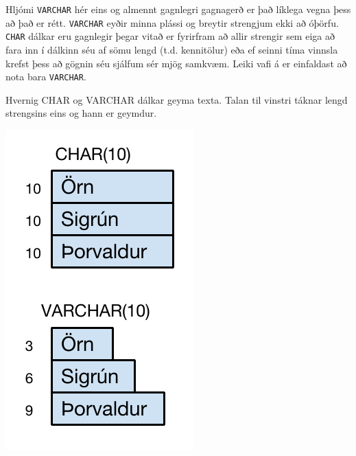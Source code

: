 Hljómi \verb|VARCHAR| hér eins og almennt gagnlegri gagnagerð er það líklega vegna þess að það er rétt. \verb|VARCHAR| eyðir minna plássi og breytir strengjum ekki að óþörfu. \verb|CHAR| dálkar eru gagnlegir þegar vitað er fyrirfram að allir strengir sem eiga að fara inn í dálkinn séu af sömu lengd (t.d. kennitölur) eða ef seinni tíma vinnsla krefst þess að gögnin séu sjálfum sér mjög samkvæm. Leiki vafi á er einfaldast að nota bara \verb|VARCHAR|.
\begin{marginfigure}
\caption[CHAR og VARCHAR]{Hvernig CHAR og VARCHAR dálkar geyma texta. Talan til vinstri táknar lengd strengsins eins og hann er geymdur.}
\label{mynd:char-varchar}
\centering
\includegraphics[width=\linewidth]{myndir/char-varchar}
\end{marginfigure}

